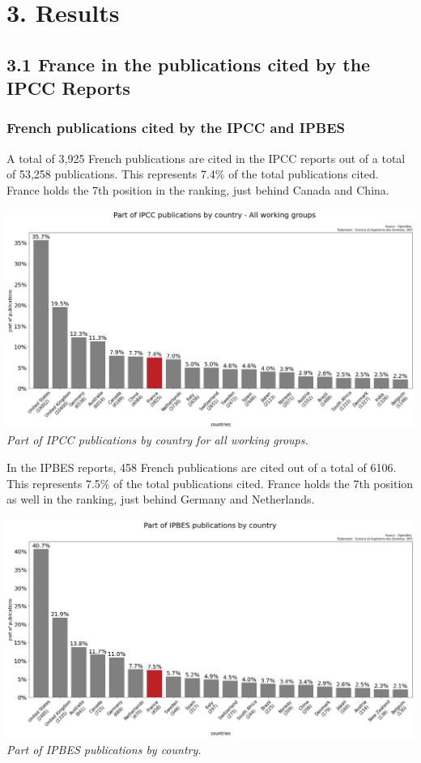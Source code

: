 \documentclass[
]{article}
\begin{document}
\hypertarget{results}{%
\section{3. Results}\label{results}}

\hypertarget{france-in-the-publications-cited-by-the-ipcc-reports}{%
\subsection{3.1 France in the publications cited by the IPCC
Reports}\label{france-in-the-publications-cited-by-the-ipcc-reports}}

\hypertarget{french-publications-cited-by-the-ipcc-and-ipbes}{%
\subsubsection{French publications cited by the IPCC and
IPBES}\label{french-publications-cited-by-the-ipcc-and-ipbes}}

A total of 3,925 French publications are cited in the IPCC reports out
of a total of 53,258 publications. This represents 7.4\% of the total
publications cited. France holds the 7th position in the ranking, just
behind Canada and China.

\includegraphics{./images/teds_ipcc_country_wg122cross3_part.png}
\emph{Part of IPCC publications by country for all working groups.}

In the IPBES reports, 458 French publications are cited out of a total
of 6106. This represents 7.5\% of the total publications cited. France
holds the 7th position as well in the ranking, just behind Germany and
Netherlands.

\includegraphics{./images/teds_ipbes_country_wg122cross3_part.png}
\emph{Part of IPBES publications by country.}
\end{document}
